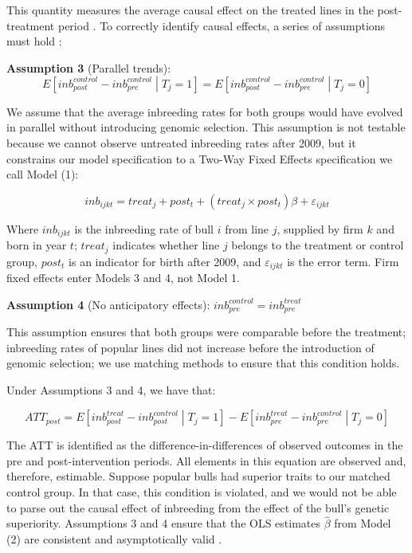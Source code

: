 \documentclass[12pt,letterpaper]{article}
\begin{document}
This quantity measures the average causal effect on the treated lines in the post-treatment period \citep{Roth2023}. To correctly identify causal effects, a series of assumptions must hold \citep{Sun2021}:

\medskip
\textbf{Assumption 3} (Parallel trends): 
\begin{equation*}
    E\left[inb_{post}^{control}-inb_{pre}^{control}\middle| T_{j}=1\right] = E\left[inb_{post}^{control}-inb_{pre}^{control} \middle| T_{j}=0\right]
\end{equation*}

We assume that the average inbreeding rates for both groups would have evolved in parallel without introducing genomic selection. This assumption is not testable because we cannot observe untreated inbreeding rates after 2009, but it constrains our model specification to a Two-Way Fixed Effects specification we call Model (1):

\begin{equation}
inb_{ijkt} = treat_{j}+post_{t}+(treat_{j}\times post_{t})\beta+\varepsilon_{ijkt}\tag{Model 1}
\end{equation}

Where $inb_{ijkt}$ is the inbreeding rate of bull $i$ from line $j$, supplied by firm $k$ and born in year $t$; $treat_{j}$ indicates whether line $j$ belongs to the treatment or control group, $post_{t}$ is an indicator for birth after 2009, and $\varepsilon_{ijkt}$ is the error term. Firm fixed effects enter Models 3 and 4, not Model 1. 

\medskip
\textbf{Assumption 4} (No anticipatory effects): $inb_{pre}^{control}=inb_{pre}^{treat}$

This assumption ensures that both groups were comparable before the treatment; inbreeding rates of popular lines did not increase before the introduction of genomic selection; we use matching methods to ensure that this condition holds. 

Under Assumptions 3 and 4, we have that:

\begin{equation}
    ATT_{post}=E\left[inb_{post}^{treat}-inb_{post}^{control} \middle| T_{j}=1\right]-E\left[inb_{pre}^{treat}-inb_{pre}^{control} \middle| T_{j}=0\right]
\end{equation}

The ATT is identified as the difference-in-differences of observed outcomes in the pre and post-intervention periods. All elements in this equation are observed and, therefore, estimable. Suppose popular bulls had superior traits to our matched control group. In that case, this condition is violated, and we would not be able to parse out the causal effect of inbreeding from the effect of the bull's genetic superiority. Assumptions 3 and 4 ensure that the OLS estimates $\hat{\beta}$ from Model (2) are consistent and asymptotically valid \citep{Roth2023}.
\end{document}
